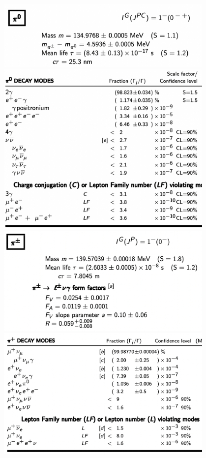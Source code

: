 \begin{center}
\includegraphics[width=0.8\textwidth]{PDG/PI_ZERO.png}
\includegraphics[width=0.8\textwidth]{PDG/PI_ZERO_DECAYS.png}
\clearpage
\includegraphics[width=0.8\textwidth]{PDG/PI_PLUS.png}
\includegraphics[width=0.8\textwidth]{PDG/PI_PLUS_DECAYS.png}

\end{center}
